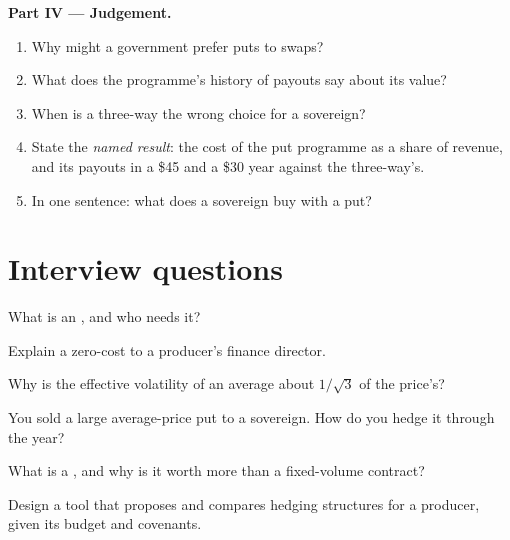 \begin{problem}
\medskip\noindent\textbf{Part IV --- Judgement.}
\begin{enumerate}[resume]
\item Why might a government prefer puts to swaps?
\item What does the programme's history of payouts say about its value?
\item When is a three-way the wrong choice for a sovereign?
\item State the \emph{named result}: the cost of the put programme as a share of revenue, and its payouts in
a \$45 and a \$30 year against the three-way's.
\item In one sentence: what does a sovereign buy with a put?
\end{enumerate}
\end{problem}

\section{Interview questions}

\begin{interviewq}\label{iq:m3:commodity-options-and-structured-hedges:1}
What is an , and who needs it?
\end{interviewq}

\begin{interviewq}\label{iq:m3:commodity-options-and-structured-hedges:2}
Explain a zero-cost  to a producer's finance director.
\end{interviewq}

\begin{interviewq}\label{iq:m3:commodity-options-and-structured-hedges:3}
Why is the effective volatility of an average about $1/\sqrt3$ of the price's?
\end{interviewq}

\begin{interviewq}\label{iq:m3:commodity-options-and-structured-hedges:4}
You sold a large average-price put to a sovereign. How do you hedge it through the year?
\end{interviewq}

\begin{interviewq}\label{iq:m3:commodity-options-and-structured-hedges:5}
What is a , and why is it worth more than a fixed-volume contract?
\end{interviewq}

\begin{interviewq}\label{iq:m3:commodity-options-and-structured-hedges:6}
Design a tool that proposes and compares hedging structures for a producer, given its budget and covenants.
\end{interviewq}
